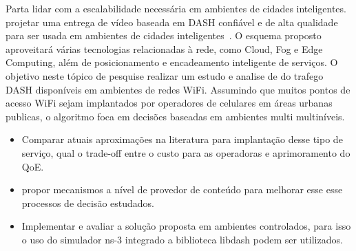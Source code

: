 Parta lidar com a escalabilidade necessária em ambientes de cidades inteligentes.
projetar uma entrega de vídeo baseada em DASH confiável e de alta qualidade para ser usada em ambientes de cidades inteligentes~\cite{gamaUCC2019, KreuzbergerWorkshop2016}. O esquema proposto aproveitará várias tecnologias relacionadas à rede, como Cloud, Fog e Edge Computing, além de posicionamento e encadeamento inteligente de serviços.%
O objetivo neste tópico de pesquise realizar um estudo e analise de do trafego DASH disponíveis em ambientes de redes WiFi. Assumindo que muitos pontos de acesso WiFi sejam implantados por operadores de celulares em áreas urbanas publicas, o algoritmo foca em decisões baseadas em ambientes multi multiníveis.  
\begin{itemize}
    \item Comparar atuais aproximações na literatura para implantação desse tipo de serviço, qual o trade-off entre o custo para as operadoras e aprimoramento do QoE.
    \item propor mecanismos a nível de provedor de conteúdo para melhorar esse esse processos de decisão estudados.
    \item Implementar e avaliar a solução proposta em ambientes controlados, para isso o uso do simulador ns-3 integrado a biblioteca libdash podem ser utilizados.   
\end{itemize}



